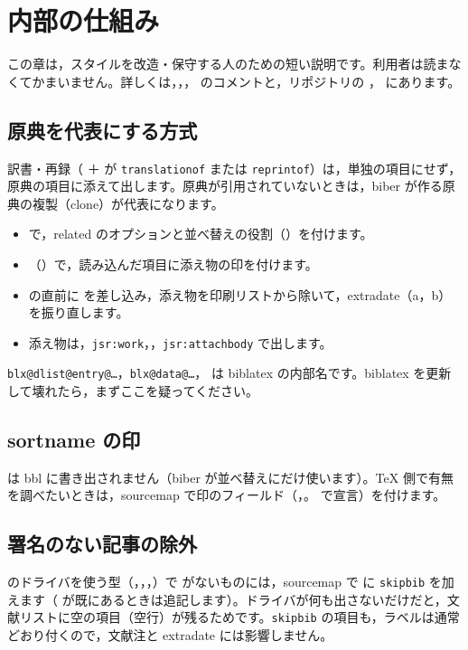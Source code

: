 \section{内部の仕組み}\label{sec:internals}
この章は，スタイルを改造・保守する人のための短い説明です。利用者は読まなくてかまいません。詳しくは，，， のコメントと，リポジトリの ， にあります。

\subsection{原典を代表にする方式}
訳書・再録（ ＋  が \texttt{translationof} または \texttt{reprintof}）は，単独の項目にせず，原典の項目に添えて出します。原典が引用されていないときは，biber が作る原典の複製（clone）が代表になります。

\begin{itemize}
\item {} で，related のオプションと並べ替えの役割（）を付けます。
\item {}（）で，読み込んだ項目に添え物の印を付けます。
\item {} の直前に  を差し込み，添え物を印刷リストから除いて，extradate（a，b）を振り直します。
\item 添え物は，\texttt{jsr:work}，，\texttt{jsr:attachbody} で出します。
\end{itemize}
\texttt{blx@dlist@entry@…}，\texttt{blx@data@…}， は biblatex の内部名です。biblatex を更新して壊れたら，まずここを疑ってください。

\subsection{sortname の印}
 は bbl に書き出されません（biber が並べ替えにだけ使います）。TeX 側で有無を調べたいときは，sourcemap で印のフィールド（，。 で宣言）を付けます。

\subsection{署名のない記事の除外}
 のドライバを使う型（，，，）で  がないものには，sourcemap で  に \texttt{skipbib} を加えます（ が既にあるときは追記します）。ドライバが何も出さないだけだと，文献リストに空の項目（空行）が残るためです。\texttt{skipbib} の項目も，ラベルは通常どおり付くので，文献注と extradate には影響しません。

